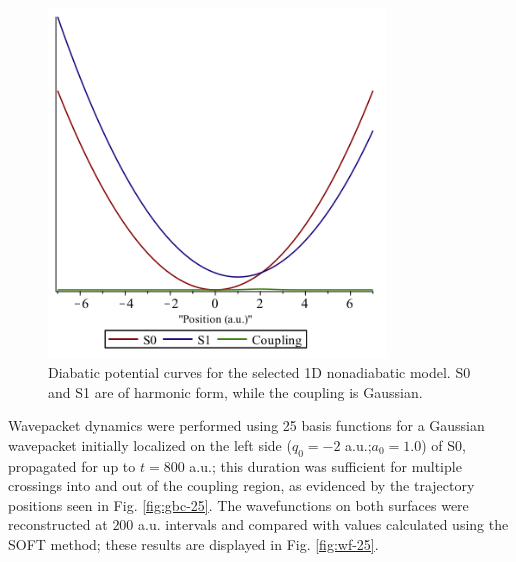\documentclass[journal=jpc]{achemso}
\begin{document}
\begin{figure}
\centering
\includegraphics[angle=0,width=0.8\textwidth]{eps-files/potentials.png}
\caption{Diabatic potential curves for the selected 1D nonadiabatic model. S0 and S1 are of harmonic form, while the coupling is Gaussian.}
\label{fig:pots}
\end{figure}
\maketitle

Wavepacket dynamics were performed using 25 basis functions for a Gaussian wavepacket initially localized on the left side ($q_0=-2$ a.u.;$a_0=1.0$) of S0, propagated for up to $t=800$ a.u.; this duration was sufficient for multiple crossings into and out of the coupling region, as evidenced by the trajectory positions seen in Fig. \ref{fig:gbc-25}. The wavefunctions on both surfaces were reconstructed at $200$ a.u. intervals and compared with values calculated using the SOFT method; these results are displayed in Fig. \ref{fig:wf-25}.
\end{document}
